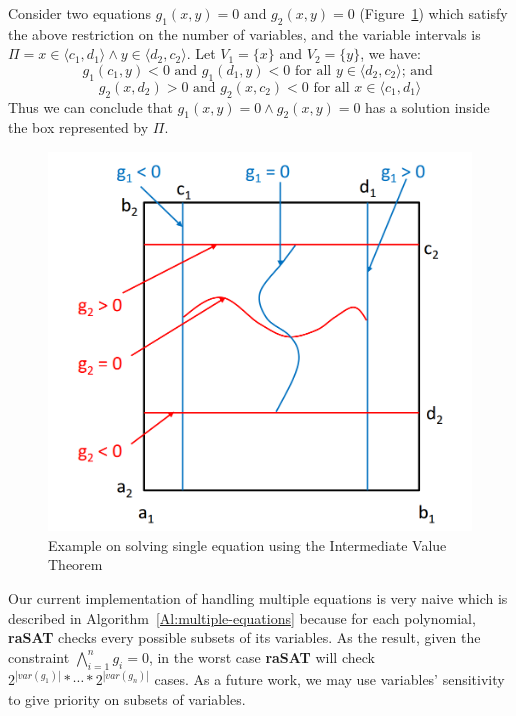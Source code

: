 \documentclass[runningheads,a4paper,oribibl]{llncs}
\begin{document}
\begin{example}
Consider two equations $g_1(x, y)=0$ and $g_2(x, y) = 0$ (Figure~\ref{fig:multiple-equations}) which satisfy the above restriction on the number of variables, and the variable intervals is $\Pi = x \in \langle c_1, d_1 \rangle \wedge y \in \langle d_2, c_2 \rangle$. Let $V_1 = \{x\}$ and $V_2 = \{y\}$, we have:
\[g_1(c_1, y) < 0\text{ and }g_1(d_1, y) < 0 \text{ for all } y \in \langle d_2, c_2 \rangle \text{; and }\]
\[g_2(x, d_2) > 0 \text{ and }g_2(x, c_2) < 0 \text{ for all } x \in \langle c_1, d_1 \rangle\]
Thus we can conclude that $g_1(x,y)=0 \wedge g_2(x,y)=0$ has a solution inside the box represented by $\Pi$.
\end{example}
\begin{figure}[ht]
\centering
\includegraphics[scale=0.4]{multipleEquations.png} 
\caption{Example on solving single equation using the Intermediate Value Theorem} 
\label{fig:multiple-equations} 
\end{figure}
Our current implementation of handling multiple equations is very naive which is described in Algorithm~\ref{Al:multiple-equations} because for each polynomial, \textbf{raSAT} checks every possible subsets of its variables. As the result, given the constraint $\bigwedge\limits_{i=1}^ng_i=0$, in the worst case \textbf{raSAT} will check $2^{|var(g_1)|}*\cdots*2^{|var(g_n)|}$ cases. As a future work, we may use variables' sensitivity to give priority on subsets of variables.
\end{document}
